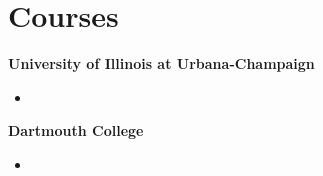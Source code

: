 
\section{\sc Courses}
{\bf University of Illinois at Urbana-Champaign}\\

\begin{itemize}
\item
\end{itemize}



{\bf Dartmouth College}\\

\begin{itemize}
\item
\end{itemize}
